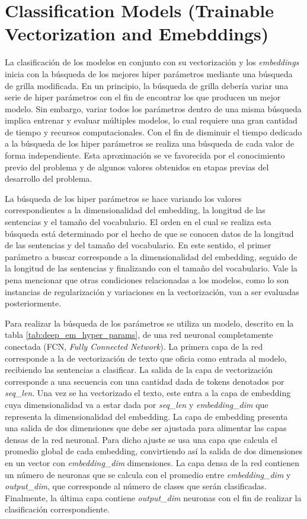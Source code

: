 \newpage
\section{Classification Models (Trainable Vectorization and Emebddings)}
La clasificación de los modelos en conjunto con su vectorización y los \textit{embeddings} inicia con la búsqueda de los mejores hiper parámetros mediante una búsqueda de grilla modificada. En un principio, la búsqueda de grilla debería variar una serie de hiper parámetros con el fin de encontrar los que producen un mejor modelo. Sin embargo, variar todos los parámetros dentro de una misma búsqueda implica entrenar y evaluar múltiples modelos, lo cual requiere una gran cantidad de tiempo y recursos computacionales. Con el fin de disminuir el tiempo dedicado a la búsqueda de los hiper parámetros se realiza una búsqueda de cada valor de forma independiente. Esta aproximación se ve favorecida por el conocimiento previo del problema y de algunos valores obtenidos en etapas previas del desarrollo del problema.

La búsqueda de los hiper parámetros se hace variando los valores correspondientes a la dimensionalidad del embedding, la longitud de las sentencias y el tamaño del vocabulario. El orden en el cual se realiza esta búsqueda está determinado por el hecho de que se conocen datos de la longitud de las sentencias y del tamaño del vocabulario. En este sentido, el primer parámetro a buscar corresponde a la dimensionalidad del embedding, seguido de la longitud de las sentencias y finalizando con el tamaño del vocabulario. Vale la pena mencionar que otras condiciones relacionadas a los modelos, como lo son instancias de regularización y variaciones en la vectorización, van a ser evaluadas posteriormente.

Para realizar la búsqueda de los parámetros se utiliza un modelo, descrito en la tabla \ref{tab:deep_em_hyper_params}, de una red neuronal completamente conectada (FCN, \textit{Fully Connected Network}). La primera capa de la red corresponde a la de vectorización de texto que oficia como entrada al modelo, recibiendo las sentencias a clasificar. La salida de la capa de vectorización corresponde a una secuencia con una cantidad dada de tokens denotados por \textit{seq\_len}. Una vez se ha vectorizado el texto, este entra a la capa de embedding cuya dimensionalidad va a estar dada por \textit{seq\_len} y \textit{embedding\_dim} que representa la dimensionalidad del embedding. La capa de embedding presenta una salida de dos dimensiones que debe ser ajustada para alimentar las capas densas de la red neuronal. Para dicho ajuste se usa una capa que calcula el promedio global de cada embedding, convirtiendo así la salida de dos dimensiones en un vector con \textit{embedding\_dim} dimensiones. La capa densa de la red contienen un número de neuronas que se calcula con el promedio entre \textit{embedding\_dim} y \textit{output\_dim}, que corresponde al número de clases que serán clasificadas. Finalmente, la última capa contiene \textit{output\_dim} neuronas con el fin de realizar la clasificación correspondiente.

